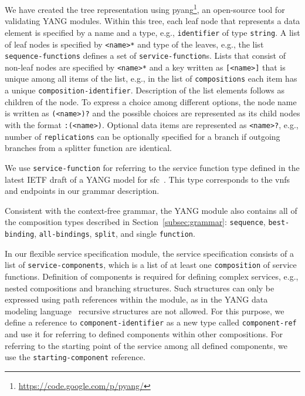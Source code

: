 \documentclass{sig-alternate-per}
\begin{document}
We have created the tree representation using pyang\footnote{\url{https://code.google.com/p/pyang/}}, an open-source tool for validating YANG
modules. Within this tree, each leaf node that represents a data element is specified by a name and a type, e.g., 
\texttt{identifier} of type \texttt{string}. A list of leaf nodes is
specified by \texttt{<name>*} and type of the leaves, e.g., the list \texttt{sequence-functions}
defines a set of \texttt{service-function}s. Lists that consist of non-leaf nodes
are specified by \texttt{<name>*} and a key written as \texttt{[<name>]} that is unique among all 
items of the list, e.g., in the list of \texttt{compositions} each item has a unique
\texttt{composition-identifier}. Description of the list elements follows as children
of the node. 
To express a choice among different options, the node name is written as
\texttt{(<name>)?} and the possible choices are represented as its child nodes 
with the format \texttt{:(<name>)}.
Optional data items are represented as \texttt{<name>?}, e.g., number of \texttt{replications}
can be optionally specified for a branch if outgoing branches from a splitter 
function are identical.

We use \texttt{service-function} for referring to the service function type defined
in the latest IETF draft of a YANG model for \ac{sfc}~\cite{draft-penno-sfc-yang-11}.
This type corresponds to the \acp{vnf} and endpoints in our grammar description.

Consistent with the context-free grammar,
the YANG module also contains all of the composition types described in 
Section~\ref{subsec:grammar}: \texttt{sequence}, 
\texttt{best-binding}, \texttt{all-bindings}, \texttt{split}, and single \texttt{function}.

In our flexible service specification module, the service
specification consists of a list of \texttt{service-components}, which is a list of 
at least one \texttt{composition} of service functions. 
Definition of components is required for defining complex services, e.g., nested compositions
and branching structures. Such structures can only be expressed using path references within the 
module, as in the YANG data modeling language~\cite{rfc6020} recursive structures are 
not allowed. For this purpose, we define a reference
to \texttt{component-identifier} as a new type called \texttt{component-ref} 
and use it for referring to defined components within other compositions. For 
referring to the starting point of the service among all defined components, we 
use the \texttt{starting-component} reference.
\end{document}
